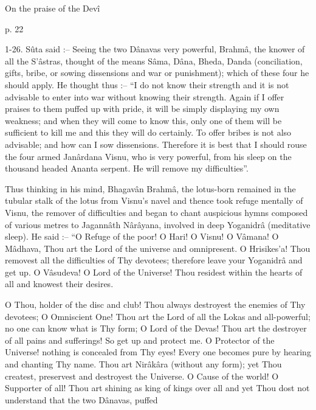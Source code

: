 On the praise of the Devî

 

p. 22

 

1-26. Sûta said :-- Seeing the two Dânavas very powerful, Brahmâ, the knower of all the S’âstras, thought of the means Sâma, Dâna, Bheda, Danda (conciliation, gifts, bribe, or sowing dissensions and war or punishment); which of these four he should apply. He thought thus :-- “I do not know their strength and it is not advisable to enter into war without knowing their strength. Again if I offer praises to them puffed up with pride, it will be simply displaying my own weakness; and when they will come to know this, only one of them will be sufficient to kill me and this they will do certainly. To offer bribes is not also advisable; and how can I sow dissensions. Therefore it is best that I should rouse the four armed Janârdana Visnu, who is very powerful, from his sleep on the thousand headed Ananta serpent. He will remove my difficulties”.

 

Thus thinking in his mind, Bhagavân Brahmâ, the lotus-born remained in the tubular stalk of the lotus from Visnu's navel and thence took refuge mentally of Visnu, the remover of difficulties and began to chant auspicious hymns composed of various metres to Jagannâth Nârâyana, involved in deep Yoganidrâ (meditative sleep). He said :-- “O Refuge of the poor! O Hari! O Visnu! O Vâmana! O Mâdhava, Thou art the Lord of the universe and omnipresent. O Hrisikes'a! Thou removest all the difficulties of Thy devotees; therefore leave your Yoganidrâ and get up. O Vâsudeva! O Lord of the Universe! Thou residest within the hearts of all and knowest their desires.

 

O Thou, holder of the disc and club! Thou always destroyest the enemies of Thy devotees; O Omniscient One! Thou art the Lord of all the Lokas and all-powerful; no one can know what is Thy form; O Lord of the Devas! Thou art the destroyer of all pains and sufferings! So get up and protect me. O Protector of the Universe! nothing is concealed from Thy eyes! Every one becomes pure by hearing and chanting Thy name. Thou art Nirâkâra (without any form); yet Thou createst, preservest and destroyest the Universe. O Cause of the world! O Supporter of all! Thou art shining as king of kings over all and yet Thou dost not understand that the two Dânavas, puffed

 

